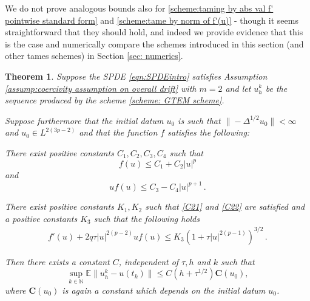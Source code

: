 \documentclass[reqno, 11pt]{amsart}
\theoremstyle{plain}
\newtheorem{theorem}{Theorem}[section]
\theoremstyle{definition}
\theoremstyle{remark}
\numberwithin{equation}{section}
\numberwithin{theorem}{section}
\newcommand{\N}{\mathbb{N}}
\newcommand{\con}{\mathbf{C}}
\begin{document}
{%

We do not prove analogous bounds also for \eqref{scheme:taming by abs val f' pointwise standard form} and \eqref{scheme:tame by norm of f'(u)} - though it seems straightforward that they should hold, and indeed we provide evidence that this is the case and  numerically compare the schemes introduced in this section (and other tames schemes) in Section \ref{sec: numerics}. 





\begin{theorem}\label{thm: UiT estimate for GTEM}
Suppose the SPDE \eqref{eqn:SPDEintro} satisfies  Assumption \ref{assump:coercivity assumption on overall drift} with $m=2$ and let $u_h^k$ be the sequence produced by the scheme \eqref{scheme: GTEM scheme}. 

Suppose furthermore that the initial datum $u_0$ is such that $\|-\Delta^{1/2} u_0\|< \infty$ and $u_0 \in L^{2(3p-2)}$ and that the function $f$ satisfies the following:
    \begin{enumerate}[label=\textnormal{[C\arabic*]},ref={[C\arabic*]}]
\item\label{pointwise cond 1} There exist positive constants $C_1, C_2, C_3, C_4$ such that
$$
f(u) \leq C_1+C_2 |u|^p
$$
and 
$$
u f(u) \leq C_3 - C_4 |u|^{p+1}\,.
$$
\item\label{pointwise cond 2}
There exist positive constants $K_1,K_2$ such that \eqref{C21} and \eqref{C22} are satisfied and a positive constants $K_3$ such that the following holds
\begin{align}
 [1-\tau |u|^{2(p-1)}] f'(u)
+ 2q\tau |u|^{2(p-2)} u f(u) \leq K_3 (1+ \tau |u|^{2(p-1)})^{3/2} \,.\nonumber
\end{align}
\end{enumerate}
   Then there exists a constant $C$, independent of $\tau, h$ and $k$ such that 
   \begin{equation}\label{eqn: UiT estimate for GTEM}
       \sup_{k \in \N } \mathbb E \|u_h^k - u(t_k)\| \leq C   (h+ \tau^{1/2}) \con(u_0), 
   \end{equation}
   where $\con(u_0)$ is again a constant which depends on the initial datum $u_0$. 
\end{theorem}





}
\end{document}
